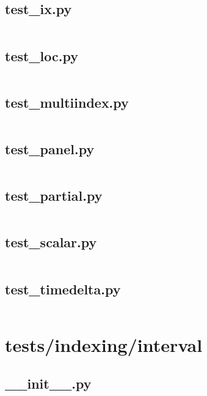 \documentclass{article}
\begin{document}
\subsection{test\_ix.py}
\inputminted{python}{/home/dufferzafar/dev/@clones/pandas/pandas/tests/indexing/test_ix.py}
\newpage

\subsection{test\_loc.py}
\inputminted{python}{/home/dufferzafar/dev/@clones/pandas/pandas/tests/indexing/test_loc.py}
\newpage

\subsection{test\_multiindex.py}
\inputminted{python}{/home/dufferzafar/dev/@clones/pandas/pandas/tests/indexing/test_multiindex.py}
\newpage

\subsection{test\_panel.py}
\inputminted{python}{/home/dufferzafar/dev/@clones/pandas/pandas/tests/indexing/test_panel.py}
\newpage

\subsection{test\_partial.py}
\inputminted{python}{/home/dufferzafar/dev/@clones/pandas/pandas/tests/indexing/test_partial.py}
\newpage

\subsection{test\_scalar.py}
\inputminted{python}{/home/dufferzafar/dev/@clones/pandas/pandas/tests/indexing/test_scalar.py}
\newpage

\subsection{test\_timedelta.py}
\inputminted{python}{/home/dufferzafar/dev/@clones/pandas/pandas/tests/indexing/test_timedelta.py}
\newpage

\section{tests/indexing/interval}

\subsection{\_\_init\_\_.py}
\inputminted{python}{/home/dufferzafar/dev/@clones/pandas/pandas/tests/indexing/interval/__init__.py}
\newpage
\end{document}

